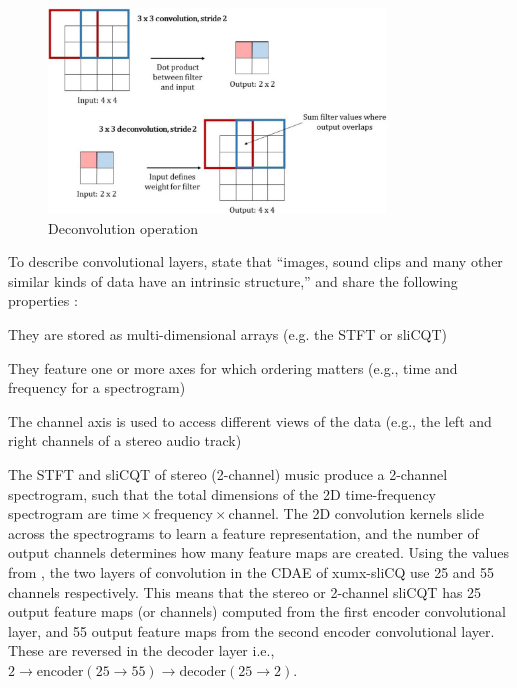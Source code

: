 \documentclass[report.tex]{subfiles}
\begin{document}
\begin{figure}[ht]
	\centering
	\includegraphics[width=0.8\textwidth]{./images-neural/convtranspose.png}
	\caption{Deconvolution operation \parencite[11]{convtranspose}}
	\label{fig:convtranspose}
\end{figure}

To describe convolutional layers, \citeauthor{convguide} state that ``images, sound clips and many other similar kinds of data have an intrinsic structure,'' and share the following properties \parencite[6]{convguide}:

\begin{tight_enumerate}
	\item
		They are stored as multi-dimensional arrays (e.g. the STFT or sliCQT)
	\item
		They feature one or more axes for which ordering matters (e.g., time and frequency for a spectrogram)
	\item
		The channel axis is used to access different views of the data (e.g., the left and right channels of a stereo audio track)
\end{tight_enumerate}

The STFT and sliCQT of stereo (2-channel) music produce a 2-channel spectrogram, such that the total dimensions of the 2D time-frequency spectrogram are $\text{time} \times \text{frequency} \times \text{channel}$. The 2D convolution kernels slide across the spectrograms to learn a feature representation, and the number of output channels determines how many feature maps are created. Using the values from \textcite{plumbley2}, the two layers of convolution in the CDAE of xumx-sliCQ use 25 and 55 channels respectively. This means that the stereo or 2-channel sliCQT has 25 output feature maps (or channels) computed from the first encoder convolutional layer, and 55 output feature maps from the second encoder convolutional layer. These are reversed in the decoder layer i.e., $2 \rightarrow \text{encoder}(25 \rightarrow 55) \rightarrow \text{decoder}(25 \rightarrow 2)$.
\end{document}
